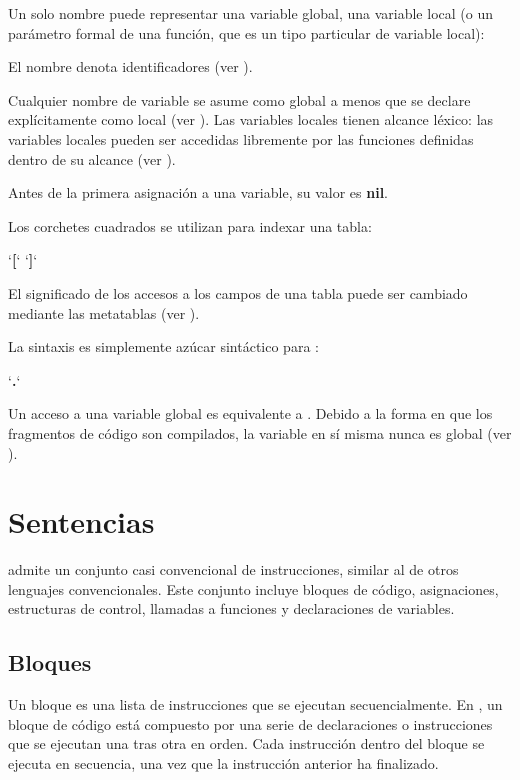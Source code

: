 Un solo nombre puede representar una variable global, una variable local (o un parámetro formal de una función, que es un tipo particular de variable local):

\hspace{2cm} 

El nombre denota identificadores (ver ).

Cualquier nombre de variable se asume como global a menos que se declare explícitamente como local (ver ). Las variables locales tienen alcance léxico: las variables locales pueden ser accedidas libremente por las funciones definidas dentro de su alcance (ver ).

Antes de la primera asignación a una variable, su valor es \textbf{nil}.

Los corchetes cuadrados se utilizan para indexar una tabla:

\hspace{2cm}  `\textbf{[}`  `\textbf{]}`

El significado de los accesos a los campos de una tabla puede ser cambiado mediante las metatablas (ver ).

La sintaxis  es simplemente azúcar sintáctico para :

\hspace{2cm}  `\textbf{.}` 

Un acceso a una variable global  es equivalente a . Debido a la forma en que los fragmentos de código son compilados, la variable  en sí misma nunca es global (ver ).


\section{Sentencias}
 admite un conjunto casi convencional de instrucciones, similar al de otros lenguajes convencionales. Este conjunto incluye bloques de código, asignaciones, estructuras de control, llamadas a funciones y declaraciones de variables.

\subsection{Bloques}
Un bloque es una lista de instrucciones que se ejecutan secuencialmente. En , un bloque de código está compuesto por una serie de declaraciones o instrucciones que se ejecutan una tras otra en orden. Cada instrucción dentro del bloque se ejecuta en secuencia, una vez que la instrucción anterior ha finalizado.

